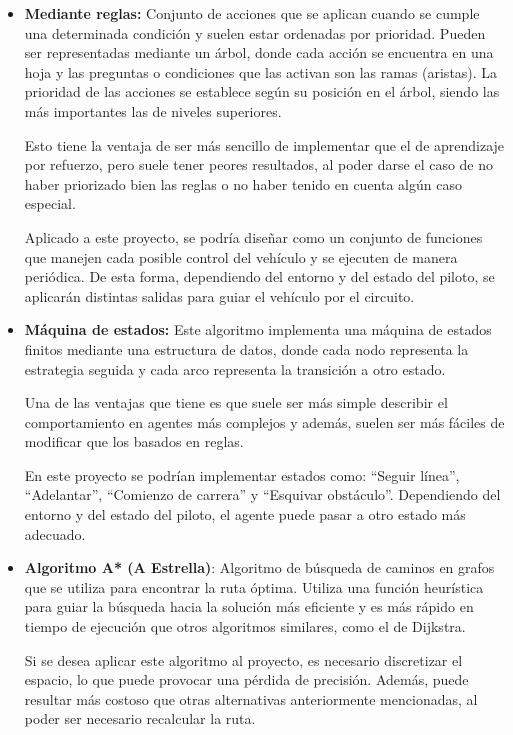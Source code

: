 \begin{itemize}
   \item \textbf{Mediante reglas:} Conjunto de acciones que se aplican cuando se cumple una determinada condición y suelen estar ordenadas por prioridad. Pueden ser representadas mediante un árbol, donde cada acción se encuentra en una hoja y las preguntas o condiciones que las activan son las ramas (aristas). La prioridad de las acciones se establece según su posición en el árbol, siendo las más importantes las de niveles superiores.
   
   Esto tiene la ventaja de ser más sencillo de implementar que el de aprendizaje por refuerzo, pero suele tener peores resultados, al poder darse el caso de no haber priorizado bien las reglas o no haber tenido en cuenta algún caso especial.


   Aplicado a este proyecto, se podría diseñar como un conjunto de funciones que manejen cada posible control del vehículo y se ejecuten de manera periódica. De esta forma, dependiendo del entorno y del estado del piloto, se aplicarán distintas salidas para guiar el vehículo por el circuito.

   \item \textbf{Máquina de estados:} Este algoritmo implementa una máquina de estados finitos mediante una estructura de datos, donde cada nodo representa la estrategia seguida y cada arco representa la transición a otro estado. 
   
   Una de las ventajas que tiene es que suele ser más simple describir el comportamiento en agentes más complejos y además, suelen ser más fáciles de modificar que los basados en reglas.

   En este proyecto se podrían implementar estados como: ``Seguir línea'', ``Adelantar'', ``Comienzo de carrera'' y ``Esquivar obstáculo''. Dependiendo del entorno y del estado del piloto, el agente puede pasar a otro estado más adecuado.

   \item \textbf{Algoritmo A* (A Estrella)}: Algoritmo de búsqueda de caminos en grafos que se utiliza para encontrar la ruta óptima. Utiliza una función heurística para guiar la búsqueda hacia la solución más eficiente y es más rápido en tiempo de ejecución que otros algoritmos similares, como el de Dijkstra.
   
   Si se desea aplicar este algoritmo al proyecto, es necesario discretizar el espacio, lo que puede provocar una pérdida de precisión. Además, puede resultar más costoso que otras alternativas anteriormente mencionadas, al poder ser necesario recalcular la ruta.


\end{itemize}

